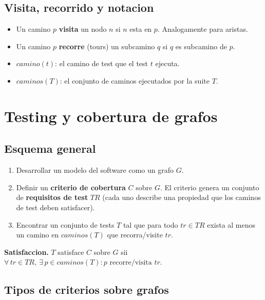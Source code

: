 \documentclass[12pt,a4paper]{article}
\begin{document}
\subsection{Visita, recorrido y notacion}

\begin{itemize}
  \item Un camino $p$ \textbf{visita} un nodo $n$ si $n$ esta en $p$. Analogamente para aristas.
  \item Un camino $p$ \textbf{recorre} (tours) un subcamino $q$ si $q$ es subcamino de $p$.
  \item $\textit{camino}(t)$: el camino de test que el test $t$ ejecuta.
  \item $\textit{caminos}(T)$: el conjunto de caminos ejecutados por la suite $T$.
\end{itemize}

\section{Testing y cobertura de grafos}

\subsection{Esquema general}

\begin{enumerate}
  \item Desarrollar un modelo del software como un grafo $G$.
  \item Definir un \textbf{criterio de cobertura} $C$ sobre $G$. El criterio genera un conjunto
  de \textbf{requisitos de test} $TR$ (cada uno describe una propiedad que los caminos de test
  deben satisfacer).
  \item Encontrar un conjunto de tests $T$ tal que para todo $tr \in TR$ exista al menos un
  camino en $\textit{caminos}(T)$ que recorra/visite $tr$.
\end{enumerate}

\begin{definicionbox}
\textbf{Satisfaccion.} $T$ satisface $C$ sobre $G$ sii
$\forall\, tr \in TR,\ \exists\, p \in \textit{caminos}(T) : p \text{ recorre/visita } tr$.
\end{definicionbox}

\subsection{Tipos de criterios sobre grafos}
\end{document}
